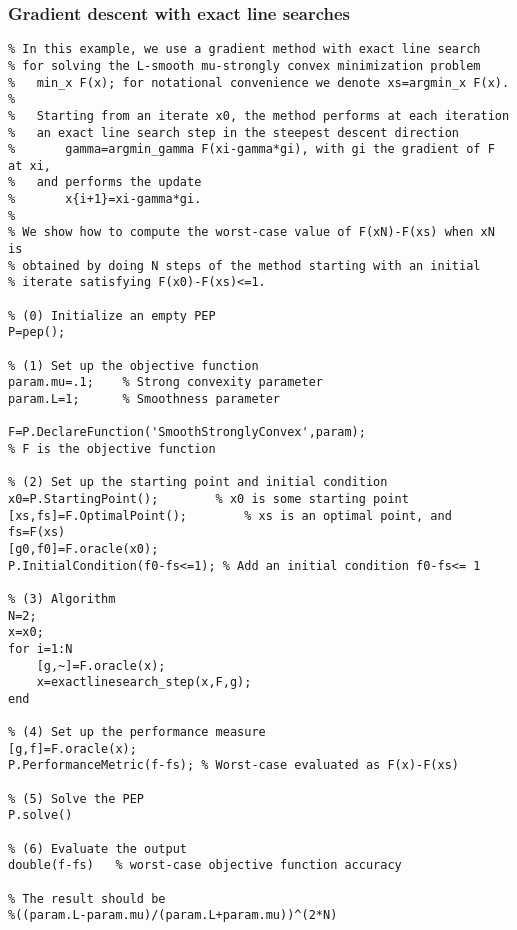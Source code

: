 \documentclass[11pt,a4paper]{article}
\begin{document}
\subsubsection{Gradient descent with exact line searches}
\begin{lstlisting}
% In this example, we use a gradient method with exact line search
% for solving the L-smooth mu-strongly convex minimization problem
%   min_x F(x); for notational convenience we denote xs=argmin_x F(x).
%
%   Starting from an iterate x0, the method performs at each iteration
%   an exact line search step in the steepest descent direction
%       gamma=argmin_gamma F(xi-gamma*gi), with gi the gradient of F at xi,
%   and performs the update
%       x{i+1}=xi-gamma*gi.
%
% We show how to compute the worst-case value of F(xN)-F(xs) when xN is
% obtained by doing N steps of the method starting with an initial
% iterate satisfying F(x0)-F(xs)<=1.

% (0) Initialize an empty PEP
P=pep();

% (1) Set up the objective function
param.mu=.1;	% Strong convexity parameter
param.L=1;      % Smoothness parameter

F=P.DeclareFunction('SmoothStronglyConvex',param); 
% F is the objective function

% (2) Set up the starting point and initial condition
x0=P.StartingPoint();		 % x0 is some starting point
[xs,fs]=F.OptimalPoint(); 		 % xs is an optimal point, and fs=F(xs)
[g0,f0]=F.oracle(x0);
P.InitialCondition(f0-fs<=1); % Add an initial condition f0-fs<= 1

% (3) Algorithm
N=2;
x=x0;
for i=1:N
    [g,~]=F.oracle(x);
    x=exactlinesearch_step(x,F,g);
end

% (4) Set up the performance measure
[g,f]=F.oracle(x);
P.PerformanceMetric(f-fs); % Worst-case evaluated as F(x)-F(xs)

% (5) Solve the PEP
P.solve()

% (6) Evaluate the output
double(f-fs)   % worst-case objective function accuracy

% The result should be
%((param.L-param.mu)/(param.L+param.mu))^(2*N)
\end{lstlisting}
\newpage
\end{document}
